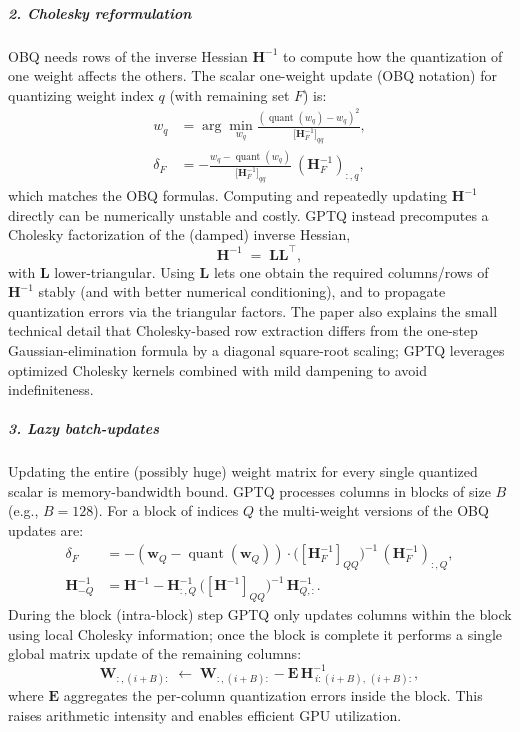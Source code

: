 \documentclass[11pt,a4paper]{article}
\theoremstyle{definition}
\begin{document}
\subparagraph{2. Cholesky reformulation}
OBQ needs rows of the inverse Hessian $\bm{H}^{-1}$ to compute how the quantization of one weight affects the others. The scalar one-weight update (OBQ notation) for quantizing weight index $q$ (with remaining set $F$) is:
\begin{align}
    w_q &= \arg\min_{w_q} \frac{(\operatorname{quant}(w_q)-w_q)^2}{\big[\bm{H}_F^{-1}\big]_{qq}}, \\
    \delta_F &= - \frac{w_q - \operatorname{quant}(w_q)}{\big[\bm{H}_F^{-1}\big]_{qq}} \ (\bm{H}_F^{-1})_{:,q},
    \label{eq:obq-update}
\end{align}
which matches the OBQ formulas. Computing and repeatedly updating $\bm{H}^{-1}$ directly can be numerically unstable and costly. GPTQ instead precomputes a Cholesky factorization of the (damped) inverse Hessian,
\begin{equation}
    \bm{H}^{-1} \;=\; \bm{L}\bm{L}^\top,
\end{equation}
with $\bm{L}$ lower-triangular. Using $\bm{L}$ lets one obtain the required columns/rows of $\bm{H}^{-1}$ stably (and with better numerical conditioning), and to propagate quantization errors via the triangular factors. The paper also explains the small technical detail that Cholesky-based row extraction differs from the one-step Gaussian-elimination formula by a diagonal square-root scaling; GPTQ leverages optimized Cholesky kernels combined with mild dampening to avoid indefiniteness.

\subparagraph{3. Lazy batch-updates}
Updating the entire (possibly huge) weight matrix for every single quantized scalar is memory-bandwidth bound. GPTQ processes columns in blocks of size $B$ (e.g., $B=128$). For a block of indices $Q$ the multi-weight versions of the OBQ updates are:
\begin{align}
    \delta_F &= - ( \bm{w}_Q - \operatorname{quant}(\bm{w}_Q) ) \cdot \big( [\bm{H}_F^{-1}]_{QQ} \big)^{-1} \, (\bm{H}_F^{-1})_{:,Q}, \label{eq:multi-delta} \\
    \bm{H}^{-1}_{-Q} &= \bm{H}^{-1} - \bm{H}^{-1}_{:,Q} \, \big( [\bm{H}^{-1}]_{QQ} \big)^{-1} \, \bm{H}^{-1}_{Q,:}. \label{eq:schur}
\end{align}
During the block (intra-block) step GPTQ only updates columns within the block using local Cholesky information; once the block is complete it performs a single global matrix update of the remaining columns:
\begin{equation}
    \bm{W}_{:,(i+B):} \;\leftarrow\; \bm{W}_{:,(i+B):} - \bm{E}\,\bm{H}^{-1}_{\,i:(i+B),\,(i+B):},
    \label{eq:block-update}
\end{equation}
where $\bm{E}$ aggregates the per-column quantization errors inside the block. This raises arithmetic intensity and enables efficient GPU utilization. 
\end{document}
